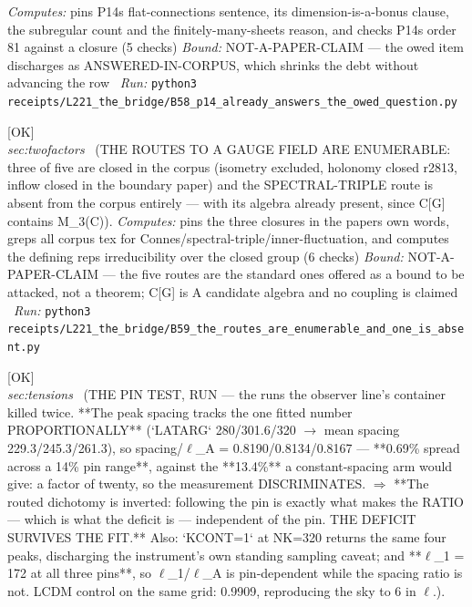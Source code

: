 \begin{description}
\emph{Computes:} pins P14s flat-connections sentence, its dimension-is-a-bonus clause, the subregular count and the finitely-many-sheets reason, and checks P14s order 81 against a closure (5 checks)
 \emph{Bound:} NOT-A-PAPER-CLAIM --- the owed item discharges as ANSWERED-IN-CORPUS, which shrinks the debt without advancing the row
\ \emph{Run:} \texttt{python3 receipts/L221\_the\_bridge/B58\_p14\_already\_answers\_the\_owed\_question.py}
\item[\label{rcpt:B59_the_routes_are_enumerable_and_one_is_absent}\texttt{B59\_the\_routes\_are\_enumerable\_and\_one\_is\_absent}]\hfill\textsf{[OK]}\\
\textit{sec:twofactors} \ (THE ROUTES TO A GAUGE FIELD ARE ENUMERABLE: three of five are closed in the corpus (isometry excluded, holonomy closed r2813, inflow closed in the boundary paper) and the SPECTRAL-TRIPLE route is absent from the corpus entirely --- with its algebra already present, since C[G] contains M\_3(C)). 
\emph{Computes:} pins the three closures in the papers own words, greps all corpus tex for Connes/spectral-triple/inner-fluctuation, and computes the defining reps irreducibility over the closed group (6 checks)
 \emph{Bound:} NOT-A-PAPER-CLAIM --- the five routes are the standard ones offered as a bound to be attacked, not a theorem; C[G] is A candidate algebra and no coupling is claimed
\ \emph{Run:} \texttt{python3 receipts/L221\_the\_bridge/B59\_the\_routes\_are\_enumerable\_and\_one\_is\_absent.py}
\item[\label{rcpt:P1_the_pin_test_run_the_spacing_follows_the_pin_so_the_ratio_does_not}\texttt{P1\_the\_pin\_test\_run\_the\_spacing\_follows\_the\_pin\_so\_the\_ratio\_does\_not}]\hfill\textsf{[OK]}\\
\textit{sec:tensions} \ (THE PIN TEST, RUN --- the runs the observer line's container killed twice. **The peak spacing tracks the one fitted number PROPORTIONALLY** (`LATARG` 280/301.6/320 \ensuremath{\to} mean spacing 229.3/245.3/261.3), so spacing/\ensuremath{\ell}\_A = 0.8190/0.8134/0.8167 --- **0.69\% spread across a 14\% pin range**, against the **13.4\%** a constant-spacing arm would give: a factor of twenty, so the measurement DISCRIMINATES. \ensuremath{\Rightarrow} **The routed dichotomy is inverted: following the pin is exactly what makes the RATIO --- which is what the deficit is --- independent of the pin. THE DEFICIT SURVIVES THE FIT.** Also: `KCONT=1` at NK=320 returns the same four peaks, discharging the instrument's own standing sampling caveat; and **\ensuremath{\ell}\_1 = 172 at all three pins**, so \ensuremath{\ell}\_1/\ensuremath{\ell}\_A is pin-dependent while the spacing ratio is not. LCDM control on the same grid: 0.9909, reproducing the sky to 6 in \ensuremath{\ell}.). 

\end{description}
